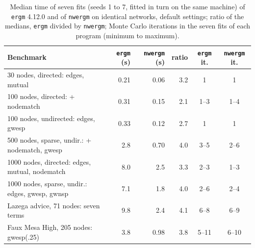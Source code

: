 \begin{table}[htbp]\centering\footnotesize\setlength{\tabcolsep}{4pt}
\caption{Median time of seven fits (seeds 1 to 7, fitted in turn on the same machine) of \texttt{ergm} 4.12.0 and of \texttt{nwergm} on identical networks, default settings; ratio of the medians, \texttt{ergm} divided by \texttt{nwergm}; Monte Carlo iterations in the seven fits of each program (minimum to maximum).\label{tab:bench}}
\begin{tabular}{@{}lrrrcc@{}}\toprule
Benchmark & \texttt{ergm} (s) & \texttt{nwergm} (s) & ratio & \texttt{ergm} it. & \texttt{nwergm} it. \\\midrule
30 nodes, directed: edges, mutual & 0.21 & 0.06 & 3.2 & 1 & 1 \\
100 nodes, directed: + nodematch & 0.31 & 0.15 & 2.1 & 1--3 & 1--4 \\
100 nodes, undirected: edges, gwesp & 0.33 & 0.12 & 2.7 & 1 & 1 \\
500 nodes, sparse, undir.: + nodematch, gwesp & 2.8 & 0.70 & 4.0 & 3--5 & 2--6 \\
1000 nodes, directed: edges, mutual, nodematch & 8.0 & 2.5 & 3.3 & 2--3 & 1--3 \\
1000 nodes, sparse, undir.: edges, gwesp, gwnsp & 7.1 & 1.8 & 4.0 & 2--6 & 2--4 \\
Lazega advice, 71 nodes: seven terms & 9.8 & 2.4 & 4.1 & 6--8 & 6--9 \\
Faux Mesa High, 205 nodes: gwesp(.25) & 3.8 & 0.98 & 3.8 & 5--11 & 6--10 \\
\bottomrule\end{tabular}\end{table}
